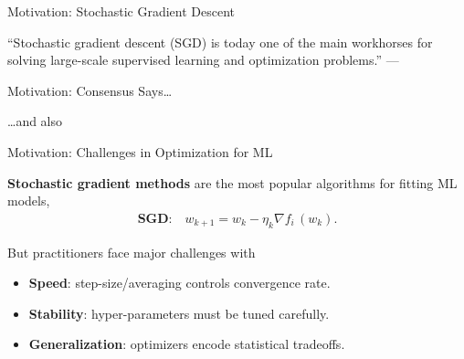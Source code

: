\documentclass[mathserif,notheorems, hyperref={colorlinks, urlcolor=blue, linkcolor=blue}]{beamer}
\def\\{}%
\begin{document}
    \begin{frame}{Motivation: Stochastic Gradient Descent}

        \begin{center}
            \Large
            ``Stochastic gradient descent (SGD) is today one of the main workhorses for solving large-scale supervised learning and optimization problems.''\\
            ---\citet{drori2019complexity}
        \end{center}

    \end{frame}

    \begin{frame}{Motivation: Consensus Says\ldots}

        \begin{center}
            \Large \dots and also~\citet{xu2017second,
            zhang2016parallel,
            patterson2017deep,
            pillaud2018statistical,
            grosse2015scaling,
            assran2018stochastic,
            damaskinos2019aggregathor,
            kawaguchi2020ordered,
            bernstein2018signsgd,
            li2019rsa,
            agarwal2017second,
            hofmann2015variance,
            geffner2019rule,
            assran2020convergence,
            gower2019sgd}
        \end{center}

    \end{frame}

    \begin{frame}{Motivation: Challenges in Optimization for ML}

        \textbf{Stochastic gradient methods} are the most popular algorithms for fitting ML models,
        \begin{align*}
            \textbf{SGD:} \quad w_{k + 1} = w_k - \eta_k \nabla f_i \, (w_k). \\
        \end{align*}


        But practitioners face major challenges with \vspace{0.5em}
        \begin{itemize}
            \item \textbf{Speed}: step-size/averaging controls convergence rate.
            \item \textbf{Stability}: hyper-parameters must be tuned carefully.
            \item \textbf{Generalization}: optimizers encode statistical tradeoffs.
        \end{itemize}
        \vspace{1em}

    \end{frame}
\end{document}
